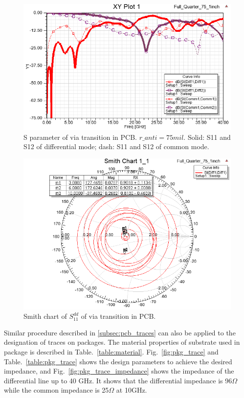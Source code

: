 \documentclass{book}  %
\renewcommand{\subsection}[1]{\psubsection{#1}}
\begin{document}
\begin{paper}
\begin{figure}[htbp!]
	\centering
	\includegraphics[width=0.8\columnwidth]{./img/PCB/Via_Transition/S_parameter.png}
	\caption{S parameter of via transition in PCB. $r\_anti = 75 mil$. Solid: S11 and S12 of differential mode; dash: S11 and S12 of common mode.}
	\label{fig:pcb_via_tran_S} %
\end{figure}

\begin{figure}[htbp!]
	\centering
	\includegraphics[width=0.8\columnwidth]{./img/PCB/Via_Transition/via_transition_smith.png}
	\caption{Smith chart of $S^{dd}_{11}$ of via transition in PCB.}
	\label{fig:pcb_via_tran_Sdd11_smith} %
\end{figure}

\subsection{Package Traces}
Similar procedure described in \ref{subsec:pcb_traces} can also be applied to the designation of traces on packages. The material properties of substrate used in package is described in Table.~\ref{table:material}.  Fig.~\ref{fig:pkg_trace} and Table.~\ref{table:pkg_trace} shows the design parameters to achieve the desired impedance, and Fig.~\ref{fig:pkg_trace_impedance} shows the impedance of the differential line up to 40 GHz. It shows that the differential impedance is 96$\Omega$ while the common impedance is 25$\Omega$ at 10GHz.


\end{paper}
\end{document}
